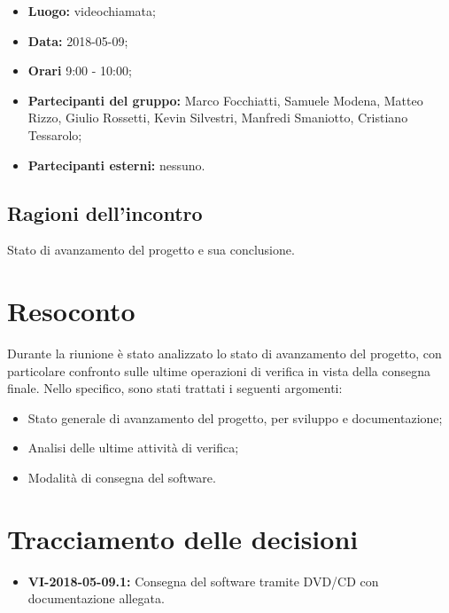\documentclass[openany,12pt,a4paper]{article}
\begin{document}
	\begin{itemize} 
	    \item \textbf{Luogo:} videochiamata;
	    \item \textbf{Data:} 2018-05-09;
	    \item \textbf{Orari} 9:00 - 10:00;
	    \item \textbf{Partecipanti del gruppo:} Marco Focchiatti, Samuele Modena, Matteo Rizzo, Giulio Rossetti, Kevin Silvestri, Manfredi Smaniotto, Cristiano Tessarolo;
	    \item \textbf{Partecipanti esterni:} nessuno.
	\end{itemize}
	
	\subsection{Ragioni dell'incontro}
	
	Stato di avanzamento del progetto e sua conclusione.

	\section{Resoconto}
	
	Durante la riunione è stato analizzato lo stato di avanzamento del progetto, con particolare confronto sulle ultime operazioni di verifica in vista della consegna finale. Nello specifico, sono stati trattati i seguenti argomenti:
	
	\begin{itemize}
		\item Stato generale di avanzamento del progetto, per sviluppo e documentazione;
		\item Analisi delle ultime attività di verifica;
		\item Modalità di consegna del software.
	\end{itemize}  
	
	\section{Tracciamento delle decisioni}
	
	\begin{itemize}
	    \item \textbf{VI-2018-05-09.1:} Consegna del software tramite DVD/CD con documentazione allegata.
	\end{itemize}	

	
\end{document}
